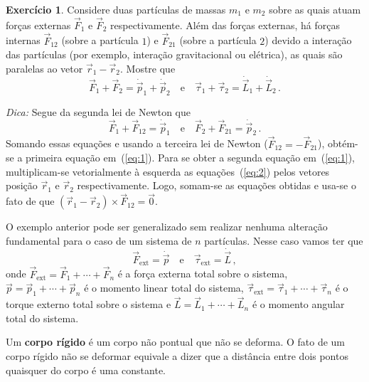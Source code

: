 \documentclass[twocolumn=on,fontsize=12pt,DIV=calc]{scrartcl}
\theoremstyle{definition}
\newtheorem{ex}{Exercício}[section]
\begin{document}
\begin{ex}
  Considere duas partículas de massas $m_1$ e $m_2$ sobre as quais
  atuam forças externas $\vec F_1$ e $\vec F_2$ respectivamente. Além
  das forças externas, há forças internas $\vec F_{12}$ (sobre a
  partícula $1$) e $\vec F_{21}$ (sobre a partícula $2$) devido a
  interação das partículas (por exemplo, interação gravitacional ou
  elétrica), as quais são paralelas ao vetor $\vec r_1-\vec
  r_2$. Mostre que
  \begin{equation}
    \label{eq:1}
    \vec F_1+\vec F_2=\dot{\vec p}_1+\dot{\vec p}_2\quad\text{e}\quad\vec\tau_1+\vec\tau_2=\dot{\vec L}_1+\dot{\vec L}_2\,.
  \end{equation}

  \noindent\textit{Dica:} Segue da segunda lei de Newton que
  \begin{equation}
    \label{eq:2}
      \vec F_1+\vec F_{12}=\dot{\vec p}_1\quad\text{e}\quad\vec F_2+\vec F_{21}=\dot{\vec p}_2\,.
  \end{equation}
  Somando essas equações e usando a terceira lei de Newton
  ($\vec F_{12}=-\vec F_{21}$), obtém-se a primeira equação
  em~(\ref{eq:1}). Para se obter a segunda equação em~(\ref{eq:1}),
  multiplicam-se vetorialmente à esquerda as equações~(\ref{eq:2})
  pelos vetores posição $\vec r_1$ e $\vec r_2$ respectivamente. Logo,
  somam-se as equações obtidas e usa-se o fato de que
  $(\vec r_1-\vec r_2)\times\vec F_{12}=\vec 0$.
\end{ex}

O exemplo anterior pode ser generalizado sem realizar nenhuma
alteração fundamental para o caso de um sistema de $n$
partículas. Nesse caso vamos ter que
\begin{equation}
  \label{eq:3}
    \vec F_{\mathrm{ext}}=\dot{\vec p}\quad\text{e}\quad
    \vec \tau_{\mathrm{ext}}=\dot{\vec L}\,,
\end{equation}
onde $\vec F_{\mathrm{ext}}=\vec F_1+\cdots+\vec F_n$ é a força
externa total sobre o sistema, $\vec p=\vec p_1+\cdots+\vec p_n$ é o
momento linear total do sistema,
$\vec\tau_{\mathrm{ext}}=\vec\tau_1+\cdots+\vec\tau_n$ é o torque
externo total sobre o sistema e $\vec L=\vec L_1+\cdots+\vec L_n$ é o
momento angular total do sistema.

Um \textbf{corpo rígido} é um corpo não pontual que não se deforma. O
fato de um corpo rígido não se deformar equivale a dizer que a
distância entre dois pontos quaisquer do corpo é uma constante.
\end{document}
